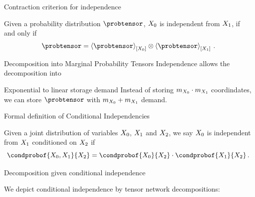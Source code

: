\documentclass{beamer}
\begin{document}
\begin{frame}{Contraction criterion for independence}

\begin{theorem}\label{the:independenceProductCriterion}
	Given a probability distribution $\probtensor$, $X_{0}$ is independent from $X_{1}$, if and only if 
	\begin{align*}
		\probtensor = \contractionof{\probtensor}{\exrandom} \otimes  \contractionof{\probtensor}{\secexrandom} \, .
	\end{align*}
\end{theorem}

\end{frame}



\begin{frame}{Decomposition into Marginal Probability Tensors}
	Independence allows the decomposition into 
	\begin{center}
		
	\end{center}

	\begin{block}{Exponential to linear storage demand}
		Instead of storing $m_{X_{0}}\cdot m_{X_{1}}$ coordindates, we can store $\probtensor$ with $m_{X_{0}}+m_{X_{1}}$ demand.
	\end{block}
\end{frame}






\begin{frame}{Formal definition of Conditional Independencies}

\begin{definition}
	Given a joint distribution of variables $X_{0}$, $X_{1}$ and $X_{2}$, we say $X_{0}$ is independent from $X_{1}$ conditioned on $X_{2}$ if 
		\[ \condprobof{\exrandom,\secexrandom}{\thirdexrandom} 
		= \condprobof{\exrandom}{\thirdexrandom} 
		\cdot \condprobof{\secexrandom}{\thirdexrandom}   \, . \]
\end{definition}


\end{frame}


\begin{frame}{Decomposition given conditional independence}

We depict conditional independence by tensor network decompositions:

\begin{center}
	
\end{center}

\end{frame}
\end{document}
